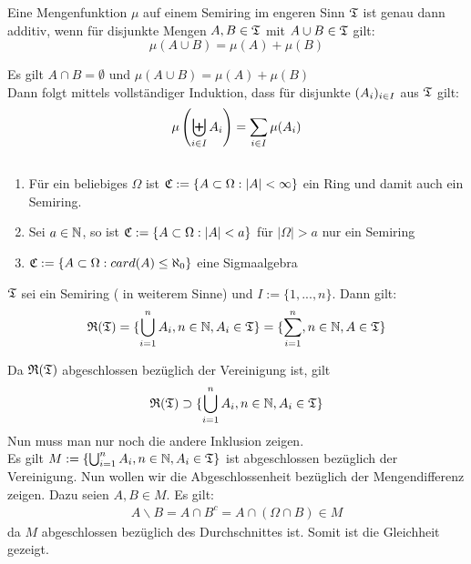 		\begin{satz}
			Eine Mengenfunktion $\mu$ auf einem Semiring im engeren Sinn $\mathfrak{T}$ ist genau dann additiv, wenn für disjunkte Mengen $A,B \in \mathfrak{T}$ mit $A \cup B \in \mathfrak{T}$ gilt:
			\[ \mu(A \cup B)=\mu(A) + \mu(B) \]
		\end{satz}
		\begin{bew}
			Es gilt $ A \cap B = \emptyset $ und $ \mu(A \cup B)=\mu(A) + \mu(B) $ \\
			Dann folgt mittels vollständiger Induktion, dass für disjunkte $(A_i)_{i \in I}$ aus $\mathfrak{T}$ gilt:
			\[ \mu \left ( \biguplus_{i \in I} A_i \right ) = \sum_{i \in I} \mu(A_i) \]
		\end{bew}
		
		\begin{bsp} $ $ 
			\begin{enumerate}[-]
				\item Für ein beliebiges $\Omega$ ist $\mathfrak{C} := \{ A \subset \Omega: |A|< \infty \} $ ein Ring und damit auch ein Semiring.
				\item Sei $a \in \mathbb{N}$, so ist $ \mathfrak{C}:=\{ A \subset \Omega: |A|<a \}$ für $|\Omega|>a$ nur ein Semiring
				\item $ \mathfrak{C} := \{ A \subset \Omega: card(A) \leq \aleph_0 \} $ eine Sigmaalgebra
			\end{enumerate}
		\end{bsp}
		
		\begin{satz}
			$\mathfrak{T}$ sei ein Semiring ( in weiterem Sinne) und $I:=\{1,...,n\}$. Dann gilt:
			\[ \mathfrak{R}(\mathfrak{T}) = \{ \bigcup_{i=1}^n A_i,n \in \mathbb{N}, A_i \in \mathfrak{T} \} = \{ \sum_{i=1}^n, n \in \mathbb{N}, A \in \mathfrak{T} \} \]
		\end{satz}
		\begin{bew}
			Da $\mathfrak{R}(\mathfrak{T})$ abgeschlossen bezüglich der Vereinigung ist, gilt
			\[ \mathfrak{R}(\mathfrak{T}) \supset \{ \bigcup_{i=1}^n A_i,n \in \mathbb{N}, A_i \in \mathfrak{T} \} \]
			Nun muss man nur noch die andere Inklusion zeigen.\\
			Es gilt $M:=\{ \bigcup_{i=1}^n A_i,n \in \mathbb{N}, A_i \in \mathfrak{T} \}$ ist abgeschlossen bezüglich der Vereinigung. Nun wollen wir die Abgeschlossenheit bezüglich der Mengendifferenz zeigen. Dazu seien $A,B \in M$. Es gilt:
			\begin{align*}
				A \backslash B = A \cap B^c = A \cap (\Omega \cap B) \in M
			\end{align*}
			da $M$ abgeschlossen bezüglich des Durchschnittes ist. Somit ist die Gleichheit gezeigt.	
		\end{bew}
		
